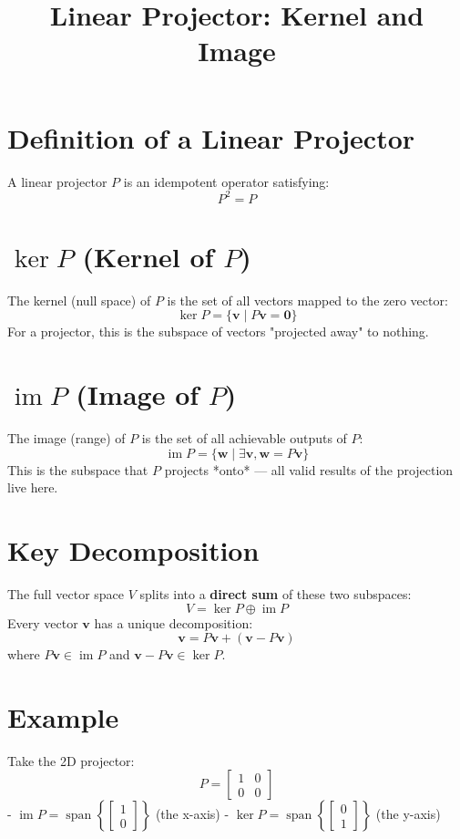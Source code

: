 \documentclass{article}
\title{Linear Projector: Kernel and Image}
\author{}
\date{}
\begin{document}
\maketitle

\section{Definition of a Linear Projector}
A linear projector $P$ is an idempotent operator satisfying:
\[
P^2 = P
\]

\section{\(\ker P\) (Kernel of \(P\))}
The kernel (null space) of $P$ is the set of all vectors mapped to the zero vector:
\[
\ker P = \{ \mathbf{v} \mid P\mathbf{v} = \mathbf{0} \}
\]
For a projector, this is the subspace of vectors "projected away" to nothing.

\section{\(\operatorname{im} P\) (Image of \(P\))}
The image (range) of $P$ is the set of all achievable outputs of $P$:
\[
\operatorname{im} P = \{ \mathbf{w} \mid \exists \mathbf{v}, \mathbf{w} = P\mathbf{v} \}
\]
This is the subspace that $P$ projects *onto* — all valid results of the projection live here.

\section{Key Decomposition}
The full vector space $V$ splits into a \textbf{direct sum} of these two subspaces:
\[
V = \ker P \oplus \operatorname{im} P
\]
Every vector $\mathbf{v}$ has a unique decomposition:
\[
\mathbf{v} = P\mathbf{v} + (\mathbf{v} - P\mathbf{v})
\]
where $P\mathbf{v} \in \operatorname{im} P$ and $\mathbf{v} - P\mathbf{v} \in \ker P$.

\section{Example}
Take the 2D projector:
\[
P = \begin{bmatrix}1 & 0 \\ 0 & 0\end{bmatrix}
\]
- $\operatorname{im} P = \operatorname{span}\left\{ \begin{bmatrix}1 \\ 0\end{bmatrix} \right\}$ (the x-axis)
- $\ker P = \operatorname{span}\left\{ \begin{bmatrix}0 \\ 1\end{bmatrix} \right\}$ (the y-axis)
\end{document}
